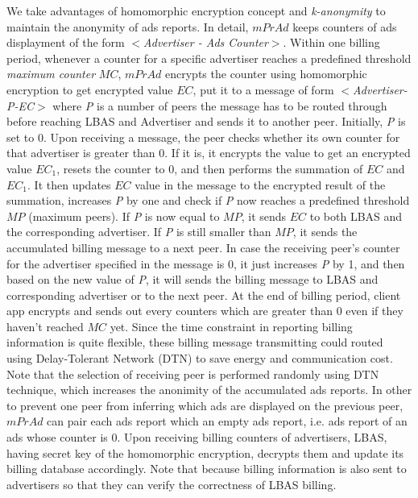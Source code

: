 We take advantages of homomorphic encryption concept and \textit{k-anonymity} \cite{k-anonymity} to maintain the anonymity of ads reports. In detail, $mPrAd$ keeps counters of ads displayment of the form \textit{$<$Advertiser - Ads Counter$>$}. Within one billing period, whenever a counter for a specific advertiser reaches a predefined threshold \textit{maximum counter} $MC$, $mPrAd$ encrypts the counter using homomorphic encryption to get encrypted value $EC$, put it to a message of form \textit{$<$Advertiser-P-EC$>$} where \textit{P} is a number of peers the message has to be routed through before reaching LBAS and Advertiser and sends it to another peer. Initially, \textit{P} is set to 0. Upon receiving a message, the peer checks whether its own counter for that advertiser is greater than 0. If it is, it encrypts the value to get an encrypted value $EC_1$, resets the counter to 0, and then performs the summation of $EC$ and $EC_1$. It then updates $EC$ value in the message to the encrypted result of the summation, increases \textit{P} by one and check if \textit{P} now reaches a predefined threshold $MP$ (maximum peers). If \textit{P} is now equal to $MP$, it sends $EC$ to both LBAS and the corresponding advertiser. If \textit{P} is still smaller than $MP$, it sends the accumulated billing message to a next peer. In case the receiving peer's counter for the advertiser specified in the message is 0, it just increases \textit{P} by 1, and then based on the new value of \textit{P}, it will sends the billing message to LBAS and corresponding advertiser or to the next peer. At the end of billing period, client app encrypts and sends out every counters which are greater than 0 even if they haven't reached $MC$ yet. Since the time constraint in reporting billing information is quite flexible, these billing message transmitting could routed using Delay-Tolerant Network (DTN) \cite{DTN} to save energy and communication cost. Note that the selection of receiving peer is performed randomly using DTN technique, which increases the anonimity of the accumulated ads reports. In other to prevent one peer from inferring which ads are displayed on the previous peer, $mPrAd$ can pair each ads report which an empty ads report, i.e. ads report of an ads whose counter is 0.   Upon receiving billing counters of advertisers, LBAS, having secret key of the homomorphic encryption, decrypts them and update its billing database accordingly. Note that because billing information is also sent to advertisers so that they can verify the correctness of LBAS billing. 



